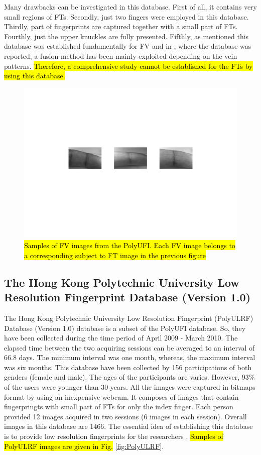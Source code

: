 \documentclass[review]{elsarticle}
\begin{document}
	Many drawbacks can be investigated in this database. First of all, it contains very small regions of FTs. Secondly, just two fingers were employed in this database. Thirdly, part of fingerprints are captured together with a small part of FTs. Fourthly, just the upper knuckles are fully presented. Fifthly, as mentioned this database was established fundamentally for FV and in \cite{Kumar2012Human}, where the database was reported, a fusion method has been mainly exploited depending on the vein patterns. 
	\hl{Therefore, a comprehensive study cannot be established for the FTs by using this database.} \\
		\begin{figure}[!h]
			\centering
			\includegraphics[page=2,scale=.57,trim=3.7cm 8cm 3.7cm 8.5cm,clip]{ft_fv_images.pdf}
			\caption{\hl{Samples of FV images from the PolyUFI. Each FV image belongs to a corresponding subject to FT image in the previous figure}}
			\label{fig:fv_images}
		\end{figure}

\subsection{The Hong Kong Polytechnic University Low Resolution Fingerprint Database (Version 1.0)}
\label{subsec:PolyULRF}
	The Hong Kong Polytechnic University Low Resolution Fingerprint (PolyULRF) Database (Version 1.0) database is a subset of the PolyUFI database. So, they have been collected during the time period of April 2009 - March 2010. The elapsed time between the two acquiring sessions can be averaged to an interval of 66.8 days. The minimum interval was one month, whereas, the maximum interval was six months. This database have been collected by 156 participations of both genders (female and male). The ages of the participants are varies. However, 93\% of the users were younger than 30 years. All the images were captured in bitmaps format by using an inexpensive webcam. It composes of images that contain fingerpringts with small part of FTs for only the index finger. Each person provided 12 images acquired in two sessions (6 images in each session). Overall images in this database are 1466. The essential idea of establishing this database is to provide low resolution fingerprints for the researchers \cite{PolyULRF}. 
	\hl{Samples of PolyULRF images are given in Fig.} \ref{fig:PolyULRF}.
	
\end{document}
